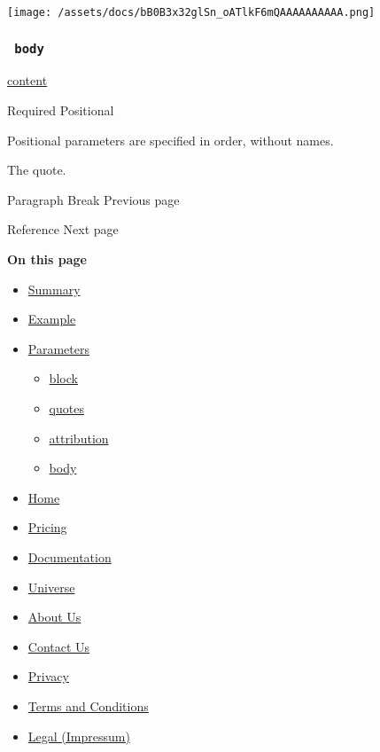 \texttt{[image: /assets/docs/bB0B3x32glSn\_oATlkF6mQAAAAAAAAAA.png]}

\subsubsection{\texorpdfstring{\texttt{\ body\ }}{ body }}\label{parameters-body}

\href{/docs/reference/foundations/content/}{content}

{Required} {{ Positional }}

\label{parameters-body-positional-tooltip}
Positional parameters are specified in order, without names.

The quote.

\href{/docs/reference/model/parbreak/}{\pandocbounded{}}

{ Paragraph Break } { Previous page }

\href{/docs/reference/model/ref/}{\pandocbounded{}}

{ Reference } { Next page }

\textbf{On this page}

\begin{itemize}
\tightlist
\item
  \hyperref[summary]{Summary}
\item
  \hyperref[example]{Example}
\item
  \hyperref[parameters]{Parameters}

  \begin{itemize}
  \tightlist
  \item
    \hyperref[parameters-block]{block}
  \item
    \hyperref[parameters-quotes]{quotes}
  \item
    \hyperref[parameters-attribution]{attribution}
  \item
    \hyperref[parameters-body]{body}
  \end{itemize}
\end{itemize}

\begin{itemize}
\tightlist
\item
  \href{/}{Home}
\item
  \href{/pricing/}{Pricing}
\item
  \href{/docs/}{Documentation}
\item
  \href{/universe/}{Universe}
\item
  \href{/about/}{About Us}
\item
  \href{/contact/}{Contact Us}
\item
  \href{/privacy/}{Privacy}
\item
  \href{https://typst.app/terms}{Terms and Conditions}
\item
  \href{/legal/}{Legal (Impressum)}
\end{itemize}

